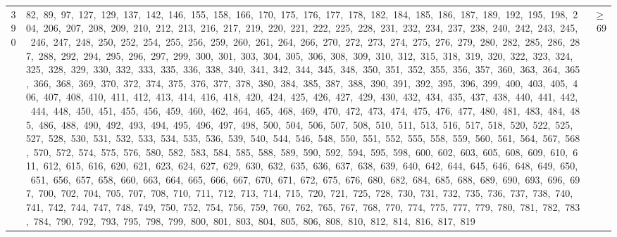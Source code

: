 \begin{longtable}{c|p{}|r}
390 & 82,\ 89,\ 97,\ 127,\ 129,\ 137,\ 142,\ 146,\ 155,\ 158,\ 166,\ 170,\ 175,\ 176,\ 177,\ 178,\ 182,\ 184,\ 185,\ 186,\ 187,\ 189,\ 192,\ 195,\ 198,\ 204,\ 206,\ 207,\ 208,\ 209,\ 210,\ 212,\ 213,\ 216,\ 217,\ 219,\ 220,\ 221,\ 222,\ 225,\ 228,\ 231,\ 232,\ 234,\ 237,\ 238,\ 240,\ 242,\ 243,\ 245,\ 246,\ 247,\ 248,\ 250,\ 252,\ 254,\ 255,\ 256,\ 259,\ 260,\ 261,\ 264,\ 266,\ 270,\ 272,\ 273,\ 274,\ 275,\ 276,\ 279,\ 280,\ 282,\ 285,\ 286,\ 287,\ 288,\ 292,\ 294,\ 295,\ 296,\ 297,\ 299,\ 300,\ 301,\ 303,\ 304,\ 305,\ 306,\ 308,\ 309,\ 310,\ 312,\ 315,\ 318,\ 319,\ 320,\ 322,\ 323,\ 324,\ 325,\ 328,\ 329,\ 330,\ 332,\ 333,\ 335,\ 336,\ 338,\ 340,\ 341,\ 342,\ 344,\ 345,\ 348,\ 350,\ 351,\ 352,\ 355,\ 356,\ 357,\ 360,\ 363,\ 364,\ 365,\ 366,\ 368,\ 369,\ 370,\ 372,\ 374,\ 375,\ 376,\ 377,\ 378,\ 380,\ 384,\ 385,\ 387,\ 388,\ 390,\ 391,\ 392,\ 395,\ 396,\ 399,\ 400,\ 403,\ 405,\ 406,\ 407,\ 408,\ 410,\ 411,\ 412,\ 413,\ 414,\ 416,\ 418,\ 420,\ 424,\ 425,\ 426,\ 427,\ 429,\ 430,\ 432,\ 434,\ 435,\ 437,\ 438,\ 440,\ 441,\ 442,\ 444,\ 448,\ 450,\ 451,\ 455,\ 456,\ 459,\ 460,\ 462,\ 464,\ 465,\ 468,\ 469,\ 470,\ 472,\ 473,\ 474,\ 475,\ 476,\ 477,\ 480,\ 481,\ 483,\ 484,\ 485,\ 486,\ 488,\ 490,\ 492,\ 493,\ 494,\ 495,\ 496,\ 497,\ 498,\ 500,\ 504,\ 506,\ 507,\ 508,\ 510,\ 511,\ 513,\ 516,\ 517,\ 518,\ 520,\ 522,\ 525,\ 527,\ 528,\ 530,\ 531,\ 532,\ 533,\ 534,\ 535,\ 536,\ 539,\ 540,\ 544,\ 546,\ 548,\ 550,\ 551,\ 552,\ 555,\ 558,\ 559,\ 560,\ 561,\ 564,\ 567,\ 568,\ 570,\ 572,\ 574,\ 575,\ 576,\ 580,\ 582,\ 583,\ 584,\ 585,\ 588,\ 589,\ 590,\ 592,\ 594,\ 595,\ 598,\ 600,\ 602,\ 603,\ 605,\ 608,\ 609,\ 610,\ 611,\ 612,\ 615,\ 616,\ 620,\ 621,\ 623,\ 624,\ 627,\ 629,\ 630,\ 632,\ 635,\ 636,\ 637,\ 638,\ 639,\ 640,\ 642,\ 644,\ 645,\ 646,\ 648,\ 649,\ 650,\ 651,\ 656,\ 657,\ 658,\ 660,\ 663,\ 664,\ 665,\ 666,\ 667,\ 670,\ 671,\ 672,\ 675,\ 676,\ 680,\ 682,\ 684,\ 685,\ 688,\ 689,\ 690,\ 693,\ 696,\ 697,\ 700,\ 702,\ 704,\ 705,\ 707,\ 708,\ 710,\ 711,\ 712,\ 713,\ 714,\ 715,\ 720,\ 721,\ 725,\ 728,\ 730,\ 731,\ 732,\ 735,\ 736,\ 737,\ 738,\ 740,\ 741,\ 742,\ 744,\ 747,\ 748,\ 749,\ 750,\ 752,\ 754,\ 756,\ 759,\ 760,\ 762,\ 765,\ 767,\ 768,\ 770,\ 774,\ 775,\ 777,\ 779,\ 780,\ 781,\ 782,\ 783,\ 784,\ 790,\ 792,\ 793,\ 795,\ 798,\ 799,\ 800,\ 801,\ 803,\ 804,\ 805,\ 806,\ 808,\ 810,\ 812,\ 814,\ 816,\ 817,\ 819 & $\ge$ 69 \\

\end{longtable}
